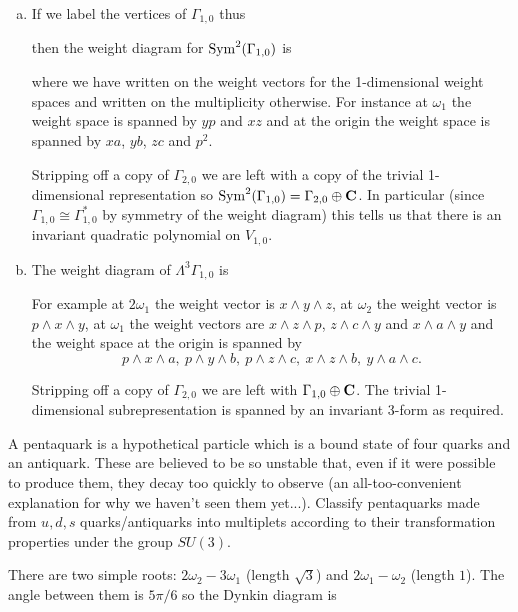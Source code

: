 \documentclass[12pt]{article}
\begin{document}
\begin{answer}
\begin{enumerate}[(a)]
\item If we label the vertices of $\Gamma_{1,0}$ thus

\gtwolabel

then the weight diagram for $\operatorname{Sym}^2(\Gamma_{1,0})$ is

\gtwolabeltwo

where we have written on the weight vectors for the 1-dimensional weight spaces and written on the multiplicity otherwise. For instance at $\omega_1$ the weight space is spanned by $yp$ and $xz$ and at the origin the weight space is spanned by $xa$, $yb$, $zc$ and $p^2$.

Stripping off a copy of $\Gamma_{2,0}$ we are left with a copy of the trivial 1-dimensional representation so $\operatorname{Sym}^2(\Gamma_{1,0})=\Gamma_{2,0}\oplus\mathbf{C}$. In particular (since $\Gamma_{1,0}\cong\Gamma_{1,0}^*$ by symmetry of the weight diagram) this tells us that there is an invariant quadratic polynomial on $V_{1,0}$.
\item The weight diagram of $\Lambda^3\Gamma_{1,0}$ is

\gtwolambdathree

For example at $2\omega_1$ the weight vector is $x\wedge y\wedge z$, at $\omega_2$ the weight vector is $p\wedge x\wedge y$, at $\omega_1$ the weight vectors are $x\wedge z \wedge p$, $z\wedge c\wedge y$ and $x\wedge a\wedge y$ and the weight space at the origin is spanned by
\[p\wedge x\wedge a,\ p\wedge y\wedge b,\ p\wedge z\wedge c,\ x\wedge z\wedge b,\ y\wedge a\wedge c.\]

Stripping off a copy of $\Gamma_{2,0}$ we are left with $\Gamma_{1,0}\oplus\mathbf{C}$. The trivial 1-dimensional subrepresentation is spanned by an invariant 3-form as required.
\end{enumerate}
\end{answer}
\newpage

\bigskip

\begin{question}[Pentaquarks]
A pentaquark is a hypothetical particle which is a bound state of four quarks and an antiquark. These are believed to be so unstable that, even if it were possible to produce them, they decay too quickly to observe (an all-too-convenient explanation for why we haven't seen them yet...). Classify pentaquarks made from $u,d,s$ quarks/antiquarks into multiplets according to their transformation properties under the group $SU(3)$.
\end{question}

\begin{answer}
There are two simple roots: $2\omega_2-3\omega_1$ (length $\sqrt{3}$) and $2\omega_1-\omega_2$ (length $1$). The angle between them is $5\pi/6$ so the Dynkin diagram is

\gtwodynkin

\end{answer}
\end{document}
